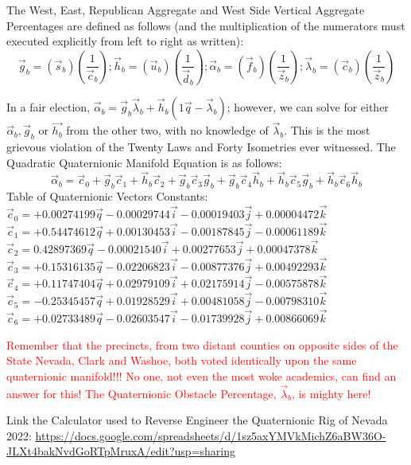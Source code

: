 The West, East, Republican Aggregate and West Side Vertical Aggregate Percentages are defined as follows (and the multiplication of the numerators must executed explicitly from left to right as written):
$$\vec{g}_{b}=\left(\vec{s}_{b}\right)\left(\frac{1}{\vec{c}_{b}}\right); \vec{h}_{b}=\left(\vec{u}_{b}\right)\left(\frac{1}{\vec{d}_{b}}\right);
\vec{\alpha}_{b}=\left(\vec{f}_{b}\right)\left(\frac{1}{\vec{z}_{b}}\right);
\vec{\lambda}_{b}=\left(\vec{c}_{b}\right)\left(\frac{1}{\vec{z}_{b}}\right)$$

In a fair election, $\vec{\alpha}_{b}=\vec{g}_{b}\vec{\lambda}_{b}+\vec{h}_{b}\left(1\vec{q}-\vec{\lambda}_{b}\right)$; however, we can solve for either $\vec{\alpha}_{b}, \vec{g}_{b}$ or $\vec{h_{b}}$ from the other two, with no knowledge of $\vec{\lambda}_{b}$. This is the most grievous violation of the Twenty Laws and Forty Isometries ever witnessed.
\newpage
The Quadratic Quaternionic Manifold Equation is as follows:
$$\vec{\alpha}_b=\vec{c}_{0}+\vec{g}_{b}\vec{c}_{1}+\vec{h}_{b}\vec{c}_{2}+\vec{g}_{b}\vec{c}_{3}\vec{g}_{b}+\vec{g}_{b}\vec{c}_{4}\vec{h}_{b}+\vec{h}_{b}\vec{c}_{5}\vec{g}_{b}+\vec{h}_{b}\vec{c}_{6}\vec{h}_{b}$$
Table of Quaternionic Vectors Constants:\\
$\vec{c}_{0}=+0.00274199\vec{q}-0.00029744\vec{i}-0.00019403\vec{j}+0.00004472\vec{k}$\\
$\vec{c}_{1}=+0.54474612\vec{q}+0.00130453\vec{i}-0.00187845\vec{j}-0.00061189\vec{k}$\\
$\vec{c}_{2}=0.42897369\vec{q}-0.00021540\vec{i}+0.00277653\vec{j}+0.00047378\vec{k}$\\
$\vec{c}_{3}=+0.15316135\vec{q}-0.02206823\vec{i}-0.00877376\vec{j}+0.00492293\vec{k}$\\
$\vec{c}_{4}=+0.11747404\vec{q}+0.02979109\vec{i}+0.02175914\vec{j}-0.00575878\vec{k}$\\
$\vec{c}_{5}=-0.25345457\vec{q}+0.01928529\vec{i}+0.00481058\vec{j}-0.00798310\vec{k}$\\
$\vec{c}_{6}=+0.02733489\vec{q}-0.02603547\vec{i}-0.01739928\vec{j}+0.00866069\vec{k}$

\textcolor{red}{Remember that the precincts, from two distant counties on opposite sides of the State Nevada, Clark and Washoe, both voted identically upon the same quaternionic manifold!!! No one, not even the most woke academics, can find an answer for this! The Quaternionic Obstacle Percentage, $\vec{\lambda}_{b}$, is mighty here!}

Link the Calculator used to Reverse Engineer the Quaternionic Rig of Nevada 2022:
\url{https://docs.google.com/spreadsheets/d/1sz5axYMVkMichZ6aBW36O-JLXt4bakNvdGoRTpMruxA/edit?usp=sharing}


